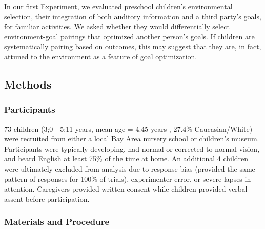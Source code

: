 \documentclass[10pt, letterpaper]{article}
\begin{document}
In our first Experiment, we evaluated preschool children's environmental
selection, their integration of both auditory information and a third
party's goals, for familiar activities. We asked whether they would
differentially select environment-goal pairings that optimized another
person's goals. If children are systematically pairing based on
outcomes, this may suggest that they are, in fact, attuned to the
environment as a feature of goal optimization.

\hypertarget{methods}{%
\subsection{Methods}\label{methods}}

\hypertarget{participants}{%
\subsubsection{Participants}\label{participants}}

73 children (3;0 - 5;11 years, mean age = 4.45 years , 27.4\%
Caucasian/White) were recruited from either a local Bay Area nursery
school or children's museum. Participants were typically developing, had
normal or corrected-to-normal vision, and heard English at least 75\% of
the time at home. An additional 4 children were ultimately excluded from
analysis due to response bias (provided the same pattern of responses
for 100\% of trials), experimenter error, or severe lapses in attention.
Caregivers provided written consent while children provided verbal
assent before participation.

\hypertarget{materials-and-procedure}{%
\subsubsection{Materials and Procedure}\label{materials-and-procedure}}
\end{document}
